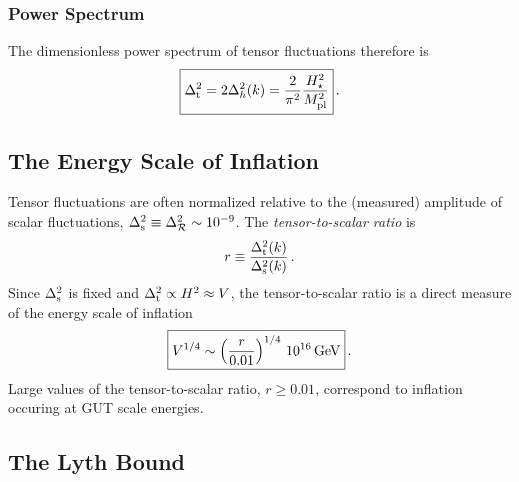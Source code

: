 \documentclass[12pt,letterpaper,rotate]{article}
\def\beq{\begin{equation}}
\def\eeq{\end{equation}}
\def\Mp{M_{\rm pl}}
\def\R{{\cal R}}
\begin{document}
{\subsubsection{Power Spectrum}
The dimensionless power spectrum of tensor fluctuations therefore is
\beq
\label{equ:maldaPt}
\fbox{$\displaystyle
\Delta_{\rm t}^2 = 2\Delta_h^2(k) = \frac{2}{\pi^2} \frac{H^2_\star}{\Mp^2} $}\, .
\eeq






\subsection{The Energy Scale of Inflation}

Tensor fluctuations are often normalized relative to the (measured) amplitude of scalar fluctuations, $\Delta_{\rm s}^2 \equiv \Delta_\R^2 \sim 10^{-9}$.
The {\it tensor-to-scalar ratio} is
\beq
r\equiv \frac{\Delta_{\rm t}^2(k)}{\Delta_{\rm s}^2(k)}\, .
\eeq
Since $\Delta_{\rm s}^2$ is fixed and $\Delta_{\rm t}^2 \propto H^2 \approx V$, the tensor-to-scalar ratio is a direct measure of the energy scale of inflation
\beq
\fbox{$\displaystyle
V^{1/4} \sim \left( \frac{r}{0.01}\right)^{1/4}\, 10^{16}\, {\rm GeV} $}\, .
\eeq 
Large values of the tensor-to-scalar ratio, $r \ge 0.01$, correspond to inflation occuring at GUT scale energies.

\subsection{The Lyth Bound}

}
\end{document}
